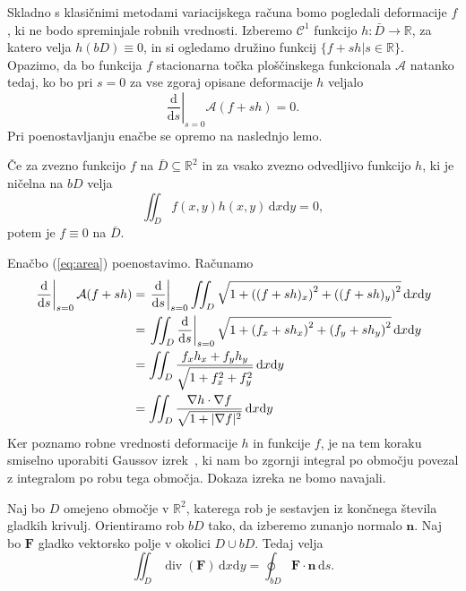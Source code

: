 \documentclass[fin1, tisk, bibtex]{fmfdelo}
\begin{document}
Skladno s klasičnimi metodami variacijskega računa bomo pogledali deformacije $f$, ki ne bodo spreminjale robnih vrednosti. Izberemo $\mathcal{C}^1$ funkcijo $h: \bar{D} \rightarrow \mathbb{R}$, za katero velja $h(bD) \equiv 0$, in si ogledamo družino funkcij $\{f+s h | s \in \mathbb{R}\}$. Opazimo, da bo funkcija $f$ stacionarna točka ploščinskega funkcionala $\mathcal{A}$ natanko tedaj, ko bo pri $s=0$ za vse zgoraj opisane deformacije $h$ veljalo 
\begin{equation}
    \left.\frac{\mathrm{d}}{\mathrm{d} s}\right|_{s=0} \mathcal{A}(f+s h)=0. \label{eq:area}
\end{equation}
Pri poenostavljanju enačbe se opremo na naslednjo lemo.
\begin{lema} \label{lem:variacijski_racuna}
    Če za zvezno funkcijo $f$ na $\bar D \subseteq \mathbb{R}^2$ in za vsako zvezno odvedljivo funkcijo $h$, ki je ničelna na $bD$ velja 
    \begin{equation*}
        \iint_D f(x,y) h(x,y) \, \mathrm{d} x \mathrm{d} y=0,
    \end{equation*}
    potem je $f \equiv 0$ na $\bar D$.
\end{lema}
Enačbo (\ref{eq:area}) poenostavimo. Računamo
\begin{align}
    \left.\frac{\mathrm{d}}{\mathrm{d} s}\right|_{s=0} \mathcal{A}(f+s h) &= \left.\frac{\mathrm{d}}{\mathrm{d} s}\right|_{s=0} \iint_{D} \sqrt{1+\left((f+s h)_x\right)^2+\left((f+s h)_y\right)^2} \, \mathrm{d} x \mathrm{d} y \notag \\
    & =\left.\iint_{D} \frac{\mathrm{d}}{\mathrm{d} s}\right|_{s=0} \sqrt{1+\left(f_x+s h_x\right)^2+\left(f_y+s h_y\right)^2} \, \mathrm{d} x \mathrm{d} y \notag \\
    & =\iint_{D} \frac{f_x h_x+f_y h_y}{\sqrt{1+f_x^2+f_y^2}} \, \mathrm{d} x \mathrm{d} y \notag \\
    & = \iint_{D} \frac{\nabla h \cdot \nabla f}{\sqrt{1+|\nabla f|^2}} \, \mathrm{d} x \mathrm{d} y \label{eq:izracun}
\end{align}
Ker poznamo robne vrednosti deformacije $h$ in funkcije $f$, je na tem koraku  smiselno uporabiti Gaussov izrek~\cite[str.~196]{ana2}, ki nam bo zgornji integral po območju povezal z integralom po robu tega območja. Dokaza izreka ne bomo navajali.
\begin{izrek}
    Naj bo $D$ omejeno območje v $\mathbb{R}^2$, katerega rob je sestavjen iz končnega števila gladkih krivulj. Orientiramo rob $bD$ tako, da izberemo zunanjo normalo $\mathbf{n}$. Naj bo $\mathbf{F}$ gladko vektorsko polje v okolici $D \cup b D$. Tedaj velja 
    \begin{equation*}
        \iint_{D}\operatorname{div}(\mathbf{F}) \, \mathrm{d}x \mathrm{d}y =\oint_{b D} \mathbf{F} \cdot \mathbf{n} \, \mathrm{d}s .
    \end{equation*}
\end{izrek}
\end{document}
